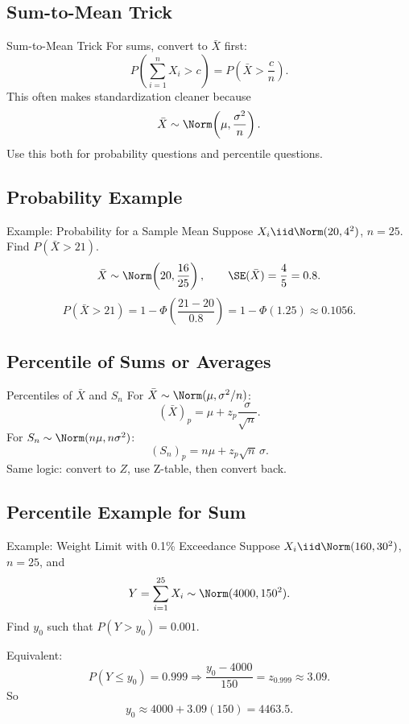 \documentclass[aspectratio=169]{beamer}
\begin{document}
\subsection{Sum-to-Mean Trick}
\begin{frame}{Sum-to-Mean Trick}
  For sums, convert to \(\bar X\) first:
  \[
    P\!\left(\sum_{i=1}^n X_i>c\right)
    =P\!\left(\bar X>\frac{c}{n}\right).
  \]
  This often makes standardization cleaner because
  \[
    \bar X\sim\Norm\!\left(\mu,\frac{\sigma^2}{n}\right).
  \]
  Use this both for probability questions and percentile questions.
\end{frame}

\subsection{Probability Example}
\begin{frame}{Example: Probability for a Sample Mean}
  Suppose \(X_i\iid\Norm(20,4^2)\), \(n=25\). Find \(P(\bar X>21)\).
  \[
    \bar X\sim\Norm\!\left(20,\frac{16}{25}\right),
    \qquad
    \SE(\bar X)=\frac{4}{5}=0.8.
  \]
  \[
    P(\bar X>21)=1-\Phi\!\left(\frac{21-20}{0.8}\right)
    =1-\Phi(1.25)
    \approx0.1056.
  \]
\end{frame}

\subsection{Percentile of Sums or Averages}
\begin{frame}{Percentiles of \(\bar X\) and \(S_n\)}
  For \(\bar X\sim\Norm(\mu,\sigma^2/n)\):
  \[
    (\bar X)_p=\mu+z_p\frac{\sigma}{\sqrt{n}}.
  \]
  For \(S_n\sim\Norm(n\mu,n\sigma^2)\):
  \[
    (S_n)_p=n\mu+z_p\sqrt{n}\,\sigma.
  \]
  Same logic: convert to \(Z\), use Z-table, then convert back.
\end{frame}

\subsection{Percentile Example for Sum}
\begin{frame}{Example: Weight Limit with 0.1\% Exceedance}
  Suppose \(X_i\iid\Norm(160,30^2)\), \(n=25\), and
  \[
    Y=\sum_{i=1}^{25}X_i\sim\Norm(4000,150^2).
  \]
  Find \(y_0\) such that \(P(Y>y_0)=0.001\).

  Equivalent:
  \[
    P(Y\le y_0)=0.999
    \Rightarrow
    \frac{y_0-4000}{150}=z_{0.999}\approx3.09.
  \]
  So
  \[
    y_0\approx 4000+3.09(150)=4463.5.
  \]
\end{frame}
\end{document}
